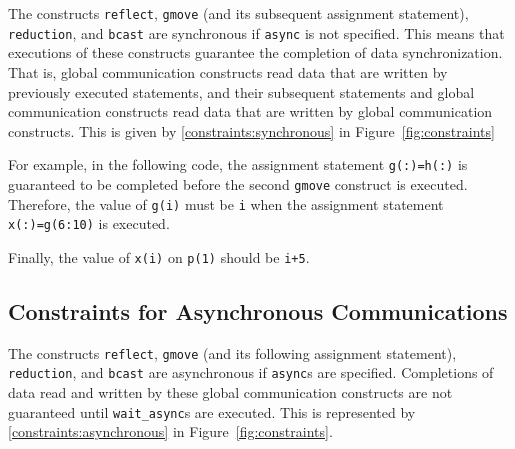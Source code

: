 The constructs \texttt{reflect}, \texttt{gmove} (and its subsequent
assignment statement), \texttt{reduction}, and \texttt{bcast} are
synchronous if \texttt{async} is not specified.  This means that
executions of these constructs guarantee the completion of data
synchronization.  That is, global communication constructs read data
that are written by previously executed statements, and their
subsequent statements and global communication constructs read data
that are written by global communication constructs.  This is given by
\ref{constraints:synchronous} in Figure~\ref{fig:constraints}

For example, in the following code, the assignment statement
\texttt{g(:)=h(:)} is guaranteed to be completed before the second
\texttt{gmove} construct is executed.  Therefore, the value of
\texttt{g(i)} must be \texttt{i} when the assignment statement
\texttt{x(:)=g(6:10)} is executed.

Finally, the value of \texttt{x(i)} on \texttt{p(1)} should be
\texttt{i+5}.

\begin{center}
\end{center}

\subsection{Constraints for Asynchronous Communications}

The constructs \texttt{reflect}, \texttt{gmove} (and its following
assignment statement), \texttt{reduction}, and \texttt{bcast} are
asynchronous if \texttt{async}s are specified.  Completions of data
read and written by these global communication constructs are not
guaranteed until \texttt{wait\_async}s are executed.  This is
represented by \ref{constraints:asynchronous} in
Figure~\ref{fig:constraints}.

